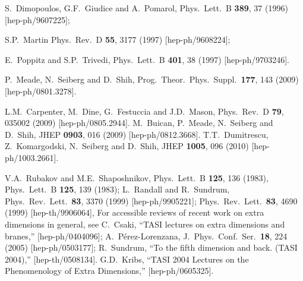 \documentclass[12pt]{article}
\begin{document}
\begin{thebibliography}{999}
S.~Dimopoulos, G.F.~Giudice and A.~Pomarol, 
  Phys.\ Lett.\ B {\bf 389}, 37 (1996)
  [hep-ph/9607225];

S.P.~Martin 
  Phys.\ Rev.\ D {\bf 55}, 3177 (1997)
  [hep-ph/9608224];

E.~Poppitz and S.P.~Trivedi, 
  Phys.\ Lett.\ B {\bf 401}, 38 (1997)
  [hep-ph/9703246].

P.~Meade, N.~Seiberg and D.~Shih,
  Prog.\ Theor.\ Phys.\ Suppl.\  {\bf 177}, 143 (2009)
  [hep-ph/0801.3278].

L.M.~Carpenter, M.~Dine, G.~Festuccia and J.D.~Mason,
  Phys.\ Rev.\  D {\bf 79}, 035002 (2009)
  [hep-ph/0805.2944].
M.~Buican, P.~Meade, N.~Seiberg and D.~Shih,
  JHEP {\bf 0903}, 016 (2009)
  [hep-ph/0812.3668].
T.T.~Dumitrescu, Z.~Komargodski, N.~Seiberg and D.~Shih,
  JHEP {\bf 1005}, 096 (2010)
  [hep-ph/1003.2661].

V.A.~Rubakov and M.E.~Shaposhnikov,
  Phys.\ Lett.\ B {\bf 125}, 136 (1983),
  Phys.\ Lett.\ B {\bf 125}, 139 (1983);
L.~Randall and R.~Sundrum,
  Phys.\ Rev.\ Lett.\  {\bf 83}, 3370 (1999)
  [hep-ph/9905221];
  Phys.\ Rev.\ Lett.\  {\bf 83}, 4690 (1999)
  [hep-th/9906064],
For accessible reviews of recent work on extra dimensions in general, see 
C.~Csaki,
  ``TASI lectures on extra dimensions and branes,''
  [hep-ph/0404096];
A.~P\'erez-Lorenzana,
  J.\ Phys.\ Conf.\ Ser.\  {\bf 18}, 224 (2005)
  [hep-ph/0503177];
R.~Sundrum,
  ``To the fifth dimension and back. (TASI 2004),''
  [hep-th/0508134].
G.D.~Kribs,
  ``TASI 2004 Lectures on the Phenomenology of Extra Dimensions,''
  [hep-ph/0605325].
  

\end{thebibliography}
\end{document}
